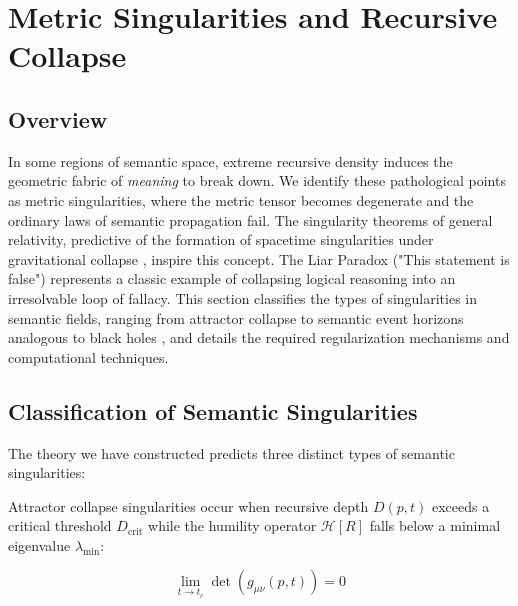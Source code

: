 \chapter{Metric Singularities and Recursive Collapse}
\label{12:metric_singularities_and_recursive_collapse}


\section{Overview}
\label{12.1:overview}

In some regions of semantic space, extreme recursive density induces the geometric fabric of \textit{meaning} to break down. We identify these pathological points as metric singularities, where the metric tensor becomes degenerate and the ordinary laws of semantic propagation fail. The singularity theorems of general relativity, predictive of the formation of spacetime singularities under gravitational collapse \autocite{Penrose1965}, inspire this concept. The Liar Paradox ("This statement is false") represents a classic example of collapsing logical reasoning into an irresolvable loop of fallacy. This section classifies the types of singularities in semantic fields, ranging from attractor collapse to semantic event horizons analogous to black holes \autocite{Hawking1974}, and details the required regularization mechanisms and computational techniques.


\section{Classification of Semantic Singularities}
\label{12.2:classification_of_semantic_singularities}

The theory we have constructed predicts three distinct types of semantic singularities:

Attractor collapse singularities occur when recursive depth \(D(p, t)\) exceeds a critical threshold \(D_{\text{crit}}\) while the humility operator \(\mathcal{H}[R]\) falls below a minimal eigenvalue \(\lambda_{\text{min}}\):

\begin{equation}
\lim_{t \to t_c} \det(g_{\mu\nu}(p, t)) = 0
\end{equation}

